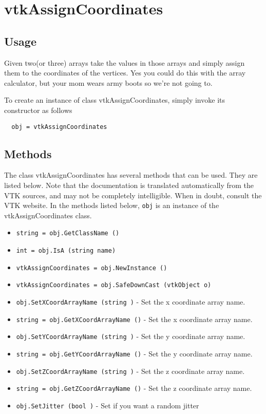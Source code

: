 \section{vtkAssignCoordinates}

\subsection{Usage}

 Given two(or three) arrays take the values in those arrays and simply assign 
 them to the coordinates of the vertices. Yes you could do this with the array 
 calculator, but your mom wears army boots so we're not going to.  

To create an instance of class vtkAssignCoordinates, simply
invoke its constructor as follows
\begin{verbatim}
  obj = vtkAssignCoordinates
\end{verbatim}
\subsection{Methods}

The class vtkAssignCoordinates has several methods that can be used.
  They are listed below.
Note that the documentation is translated automatically from the VTK sources,
and may not be completely intelligible.  When in doubt, consult the VTK website.
In the methods listed below, \verb|obj| is an instance of the vtkAssignCoordinates class.
\begin{itemize}
\item  \verb|string = obj.GetClassName ()|

\item  \verb|int = obj.IsA (string name)|

\item  \verb|vtkAssignCoordinates = obj.NewInstance ()|

\item  \verb|vtkAssignCoordinates = obj.SafeDownCast (vtkObject o)|

\item  \verb|obj.SetXCoordArrayName (string )| -  Set the x coordinate array name. 

\item  \verb|string = obj.GetXCoordArrayName ()| -  Set the x coordinate array name. 

\item  \verb|obj.SetYCoordArrayName (string )| -  Set the y coordinate array name. 

\item  \verb|string = obj.GetYCoordArrayName ()| -  Set the y coordinate array name. 

\item  \verb|obj.SetZCoordArrayName (string )| -  Set the z coordinate array name. 

\item  \verb|string = obj.GetZCoordArrayName ()| -  Set the z coordinate array name. 

\item  \verb|obj.SetJitter (bool )| -  Set if you want a random jitter

\end{itemize}
